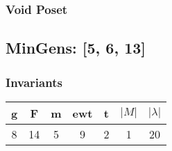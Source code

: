 \documentclass[a4paper]{article}
\begin{document}
\hfill\begin{minipage}{0.48\textwidth}
\subsubsection*{Void Poset}
\centering
{}
\end{minipage}
\newpage\subsection{MinGens: [5, 6, 13]}
\noindent\begin{minipage}{0.6\textwidth}
\subsubsection*{Invariants}
\centering
\begin{tabular}{|c|c|c|c|c|c|c|}
\toprule
g & F & m & ewt & t & \(|M|\) & \(|\lambda|\) \\
\midrule
8 & 14 & 5 & 9 & 2 & 1 & 20 \\
\bottomrule
\end{tabular}
\end{minipage}%
\end{document}

